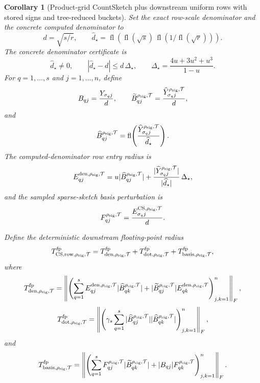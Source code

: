 \documentclass[11pt]{article}
\newcommand{\Frob}[1]{\left\lVert #1\right\rVert_F}
\newcommand{\fl}{\operatorname{fl}}
\newtheorem{corollary}[theorem]{Corollary}
\theoremstyle{remark}
\begin{document}
\begin{corollary}[Product-grid CountSketch plus downstream uniform rows with stored signs and tree-reduced buckets]
Set the exact row-scale denominator and the concrete computed denominator to
\[
  d=\sqrt{s/r},
  \qquad
  \widehat d_\star
  =
  \fl\!\left(
    \fl(\sqrt{s})\,\fl(1/\fl(\sqrt r))
  \right).
\]
The concrete denominator certificate is
\[
  \widehat d_\star\ne0,\qquad
  |\widehat d_\star-d|\le d\,\Delta_\star,
  \qquad
  \Delta_\star=\frac{4u+3u^2+u^3}{1-u}.
\]
For \(q=1,\ldots,s\) and \(j=1,\ldots,n\), define
\[
  B_{qj}=\frac{Y_{\sigma_qj}}{d},
  \qquad
  \widetilde B^{\rho_{\rm sig},\mathcal T}_{qj}
  =
  \frac{\widehat Y^{\rho_{\rm sig},\mathcal T}_{\sigma_qj}}{d},
\]
and
\[
  \widehat B^{\rho_{\rm sig},\mathcal T}_{qj}
  =
  \fl\!\left(
    \frac{\widehat Y^{\rho_{\rm sig},\mathcal T}_{\sigma_qj}}
         {\widehat d_\star}
  \right).
\]
The computed-denominator row entry radius is
\[
  E^{{\rm den},\rho_{\rm sig},\mathcal T}_{qj}
  =
  u|\widehat B^{\rho_{\rm sig},\mathcal T}_{qj}|
  +
  \frac{|\widehat Y^{\rho_{\rm sig},\mathcal T}_{\sigma_qj}|}
       {|\widehat d_\star|}\,\Delta_\star ,
\]
and the sampled sparse-sketch basis perturbation is
\[
  F^{\rho_{\rm sig},\mathcal T}_{qj}
  =
  \frac{E^{{\rm CS},\rho_{\rm sig},\mathcal T}_{\sigma_qj}}{d}.
\]

Define the deterministic downstream floating-point radius
\[
  T_{{\rm CS,row},\rho_{\rm sig},\mathcal T}^{\rm fp}
  =
  T_{{\rm den},\rho_{\rm sig},\mathcal T}^{\rm fp}
  +
  T_{{\rm dot},\rho_{\rm sig},\mathcal T}^{\rm fp}
  +
  T_{{\rm basis},\rho_{\rm sig},\mathcal T}^{\rm fp},
\]
where
\[
  T_{{\rm den},\rho_{\rm sig},\mathcal T}^{\rm fp}
  =
  \Frob{
    \left(
      \sum_{q=1}^{s}
      E^{{\rm den},\rho_{\rm sig},\mathcal T}_{qj}
        |\widehat B^{\rho_{\rm sig},\mathcal T}_{qk}|
      +
      |\widetilde B^{\rho_{\rm sig},\mathcal T}_{qj}|
        E^{{\rm den},\rho_{\rm sig},\mathcal T}_{qk}
    \right)_{j,k=1}^{n}
  },
\]
\[
  T_{{\rm dot},\rho_{\rm sig},\mathcal T}^{\rm fp}
  =
  \Frob{
    \left(
      \gamma_s\sum_{q=1}^{s}
      |\widehat B^{\rho_{\rm sig},\mathcal T}_{qj}|
      |\widehat B^{\rho_{\rm sig},\mathcal T}_{qk}|
    \right)_{j,k=1}^{n}
  },
\]
and
\[
  T_{{\rm basis},\rho_{\rm sig},\mathcal T}^{\rm fp}
  =
  \Frob{
    \left(
      \sum_{q=1}^{s}
      F^{\rho_{\rm sig},\mathcal T}_{qj}
        |\widetilde B^{\rho_{\rm sig},\mathcal T}_{qk}|
      +
      |B_{qj}|F^{\rho_{\rm sig},\mathcal T}_{qk}
    \right)_{j,k=1}^{n}
  }.
\]


\end{corollary}
\end{document}
